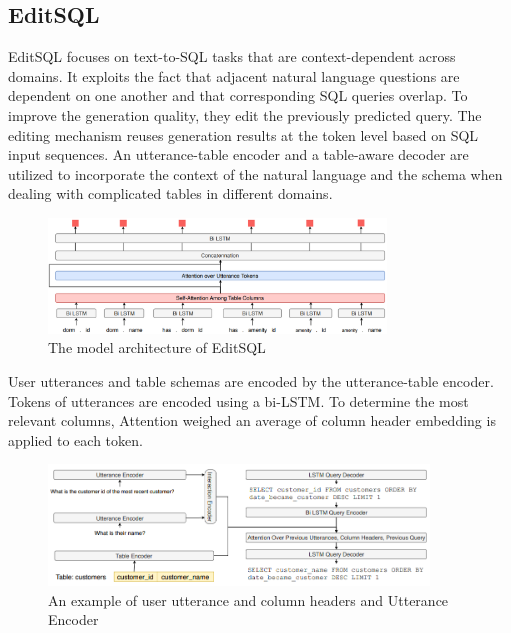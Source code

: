 \subsection{EditSQL}

EditSQL\cite{DBLP:journals/corr/abs-1909-00786} focuses on text-to-SQL tasks that are context-dependent across domains.
It exploits the fact that adjacent natural language questions are dependent on one another and that corresponding SQL queries overlap.
To improve the generation quality, they edit the previously predicted query.
The editing mechanism reuses generation results at the token level based on SQL input sequences.
An utterance-table encoder and a table-aware decoder are utilized to incorporate the context of the natural language and the schema when dealing with complicated tables in different domains.

\begin{figure}[htb]
    \centering
    \includegraphics[width=0.8\textwidth]{pics/EditSQL/Table.png}
    \caption{The model architecture of EditSQL \cite{DBLP:journals/corr/abs-1909-00786}}
    \label{fig:EditSQL}
\end{figure}

User utterances and table schemas are encoded by the utterance-table encoder. Tokens of utterances are encoded using a bi-LSTM.
To determine the most relevant columns, Attention weighed an average of column header embedding is applied to each token.

\begin{figure}[htb]
    \centering
    \includegraphics[width=0.9\textwidth]{pics/EditSQL/model.png}
    \caption{An example of user utterance and column headers and Utterance Encoder \cite{DBLP:journals/corr/abs-1909-00786}}
    \label{fig:EditSQL_model}
\end{figure}

